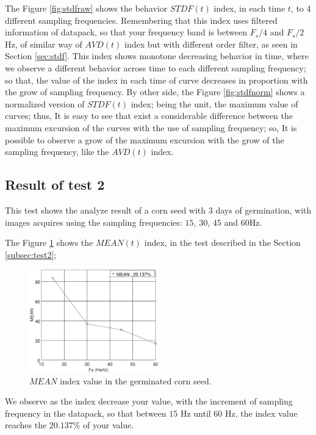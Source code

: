 \documentclass[review]{elsarticle}
\begin{document}
The Figure \ref{fig:stdfraw} shows the behavior $STDF(t)$ index, in each time $t$, 
to 4 different sampling frequencies. Remembering that this index uses filtered 
information of datapack, so that your frequency
band is between $F_s/4$ and $F_s/2$ Hz, of similar way of $AVD(t)$ index but with
different order filter, as seen in Section \ref{sec:stdf}.
This index shows monotone decreasing behavior in time, where we observe 
a different behavior across time to each different sampling frequency;
so that, the value of the index in each time of curve decreases in proportion with 
the grow of sampling frequency. By other side,
the Figure \ref{fig:stdfnorm} shows a normalized version of $STDF(t)$ index;
being the unit, the maximum value of curves; thus,
It is easy to see that exist a considerable difference between the maximum excursion 
of the curves with the use of sampling frequency; so, It is possible to observe a 
grow of the maximum excursion with the grow of the sampling frequency, like the $AVD(t)$ index.

\subsection{Result of test 2}
\label{subsec:resulttest2}

This test shows the analyze result of a corn seed  with 3 days of germination,
with images acquires using the sampling frequencies: $15$, $30$, $45$ and $60$Hz.

The Figure \ref{fig:MEANtest2} shows the $MEAN(t)$ index,
in the test described in the Section \ref{subsec:test2};
\begin{figure}[ht!]
    \centering
    \includegraphics[width=0.5\textwidth]{FPS_Semilla_3_3diasALLMEAN.eps}
    \caption{$MEAN$ index value in the germinated corn seed.}\label{fig:MEANtest2}
\end{figure}
We observe as the index decrease your value, 
with the increment of sampling frequency in the datapack,
so that between $15$ Hz until $60$ Hz, the index value reaches the $20.137\%$ of your value.
\end{document}
